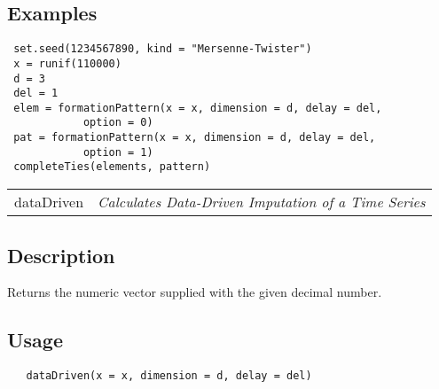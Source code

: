 \documentclass[12pt,letterpaper]{article}
\begin{document}
\subsection*{Examples}

\begin{lstlisting}
 set.seed(1234567890, kind = "Mersenne-Twister")
 x = runif(110000)
 d = 3
 del = 1
 elem = formationPattern(x = x, dimension = d, delay = del,
 			option = 0)
 pat = formationPattern(x = x, dimension = d, delay = del, 
 			option = 1)
 completeTies(elements, pattern)
\end{lstlisting}



\hrulefill   

\begin{table}[!ht]
\begin{center}
\begin{tabularx}{\textwidth}{ X X}
\hspace{0.5cm} dataDriven & \textit{Calculates Data-Driven Imputation of a Time Series}\\
\end{tabularx}
\end{center}
\end{table} 

\vspace{-0.5cm}

\hrulefill  

\vspace{0.5cm}

\subsection*{Description}

Returns the numeric vector supplied with the given decimal number.

\vspace{0.5cm}

\subsection*{Usage}

\begin{lstlisting}
   dataDriven(x = x, dimension = d, delay = del)
\end{lstlisting}

\vspace{0.5cm}
\end{document}

